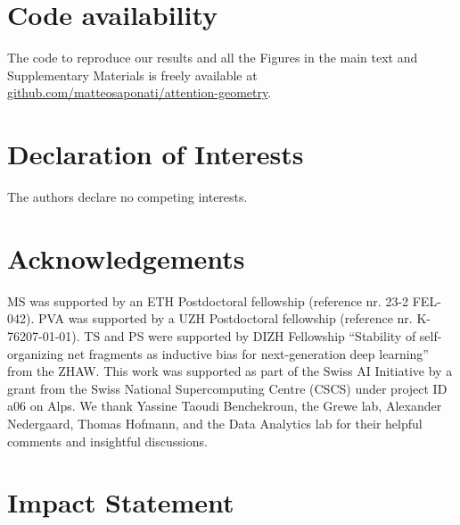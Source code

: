 \documentclass{article}
\theoremstyle{plain}
\theoremstyle{definition}
\theoremstyle{remark}
\begin{document}
\section*{Code availability}
%
The code to reproduce our results and all the Figures in the main text and Supplementary Materials is freely available at \href{https://github.com/matteosaponati/attention-geometry}{github.com/matteosaponati/attention-geometry}.
%
%
\section*{Declaration of Interests}
%
The authors declare no competing interests.




\section*{Acknowledgements}
%
MS was supported by an ETH Postdoctoral fellowship (reference nr. 23-2 FEL-042). 
%
PVA was supported by a UZH Postdoctoral fellowship (reference nr. K-76207-01-01).
%
TS and PS were supported by DIZH Fellowship ``Stability of self-organizing net fragments as inductive bias for next-generation deep learning'' from the ZHAW.
%
This work was supported as part of the Swiss AI Initiative by a grant from the Swiss National Supercomputing Centre (CSCS) under project ID a06 on Alps.
%
We thank Yassine Taoudi Benchekroun, the Grewe lab, Alexander Nedergaard, Thomas Hofmann, and the Data Analytics lab for their helpful comments and insightful discussions.\\







\section*{Impact Statement}
\end{document}
